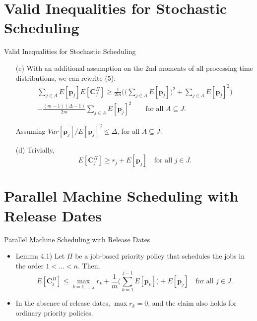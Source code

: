 \documentclass{beamer}
\begin{document}
\section{Valid Inequalities for Stochastic Scheduling}
\begin{frame}{Valid Inequalities for Stochastic Scheduling}
    \begin{itemize}
        \justifying    
        \item[(c)] With an additional assumption on the 2nd moments of all processing time distributions, we can rewrite (5):
        \vspace{0.4cm}
        \begin{equation}
            \begin{split}
            \sum\limits_{j\in A}E[\pmb{p}_j]E[\pmb{C}_j^\Pi] 
            \geq \frac{1}{2m} \Bigg(\Bigg(  \sum\limits_{j\in A}E[\pmb{p}_j]\Bigg)^2 + \sum\limits_{j\in A}E[\pmb{p}_j]^2 \Bigg)
            \\ - \frac{(m-1)(\Delta-1)}{2m}\sum\limits_{j\in A}E[\pmb{p}_j]^2
            \qquad \text{for all } A \subseteq J. 
            \end{split}
        \end{equation}
        \item[] Assuming $Var[\pmb{p}_j]/E[\pmb{p}_j]^2 \leq \Delta$, \quad for all $A \subseteq J$.
        \vspace{0.8cm}
        \item[(d)] Trivially,
        \begin{equation}
        E[\pmb{C}_j^{\Pi}]\geq r_j+E[\pmb{p}_j] \quad \text{for all } j \in J.
        \end{equation}
    \end{itemize}
\end{frame}

\section{Parallel Machine Scheduling with Release Dates}
\begin{frame}{Parallel Machine Scheduling with Release Dates}
    \begin{itemize}
        \justifying
        \item Lemma 4.1) Let $\Pi$ be a job-based priority policy that schedules the jobs in the order $1<\dots<n$. Then,
        \vspace{0.6cm}
        \begin{equation}
        E[\pmb{C}_j^\Pi] \leq \max\limits_{k=1,\dots,j}r_k+\frac{1}{m}\Bigg( \sum\limits_{k=1}^{j-1}E[\pmb{p}_k] \Bigg)+E[\pmb{p}_j]
        \quad \text{for all }j\in J.
        \end{equation}
        \vspace{0.6cm}
        \item In the absence of release dates, $\max r_k=0$, and the claim also holds for ordinary priority policies.
    \end{itemize}
\end{frame}
\end{document}
